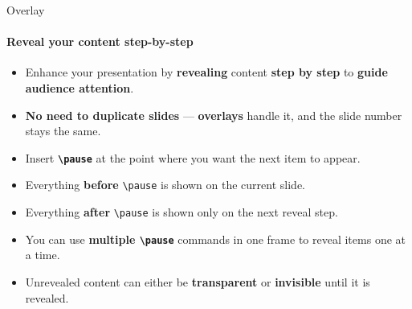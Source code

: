 \documentclass[aspectratio=169]{beamer}
\begin{document}
\begin{frame}{Overlay}
    \framesubtitle{Reveal your content step-by-step}

    \begin{coloredblock}[yellow]
        \begin{itemize}
            \item \footnotesize Enhance your presentation by \textbf{revealing} content \textbf{step by step} to \textbf{guide audience attention}.
            \item \footnotesize \textbf{No need to duplicate slides} — \textbf{overlays} handle it, and the slide number stays the same.
        \end{itemize}
    \end{coloredblock}

    \pause
    \vspace{-0.5cm}
    \begin{minipage}[t]{0.49\textwidth}
        \begin{coloredblock}
            \begin{itemize}
                \item \footnotesize Insert \textbf{\texttt{\textbackslash pause}} at the point where you want the next item to appear.
                \item \footnotesize Everything \textbf{before} \texttt{\textbackslash pause} is shown on the current slide.
                \item \footnotesize Everything \textbf{after} \texttt{\textbackslash pause} is shown only on the next reveal step.
                \item \footnotesize You can use \textbf{multiple \texttt{\textbackslash pause}} commands in one frame to reveal items one at a time.
            \end{itemize}
        \end{coloredblock}
    \end{minipage}
    \hfill
    \pause
    \begin{minipage}[t]{0.49\textwidth}
        \begin{coloredblock}
            \begin{itemize}
               \item \footnotesize Unrevealed content can either be \textbf{transparent} or \textbf{invisible} until it is revealed.

\end{itemize}
\end{coloredblock}
\end{minipage}
\end{frame}
\end{document}
